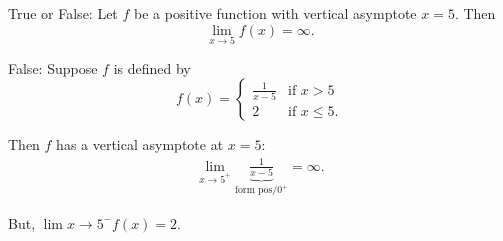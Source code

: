\documentclass[nooutcomes]{ximera}
\renewenvironment{freeResponse}{
\ifhandout\setbox0\vbox\bgroup\else
\begin{trivlist}\item[\hskip \labelsep\bfseries Solution:\hspace{2ex}]
\fi}
{\ifhandout\egroup\else
\end{trivlist}
\fi}
\begin{document}
\begin{problem}
  \label{problem:vertical-asymptote}
  True or False: Let $f$ be a positive function with vertical asymptote $x = 5$. Then
  \[
    \lim_{x \to 5} f(x) = \infty.
  \]
  \begin{freeResponse}
    False: Suppose $f$ is defined by
    \[
      f(x) =
      \begin{cases}
        \frac{1}{x - 5} & \mbox{if $x > 5$}\\
        2 & \mbox{if $x \le 5$}.
      \end{cases}
    \]
    
    Then $f$ has a vertical asymptote at $x = 5$:
    \begin{align*}
      \lim_{x \to 5^+} \underbrace{\frac{1}{x-5}}_\text{form $\mbox{pos}/0^+$} = \infty.
    \end{align*}

    But, $\displaystyle \lim{x \to 5^-} f(x) = 2$.
  \end{freeResponse}
\end{problem}
\end{document}
